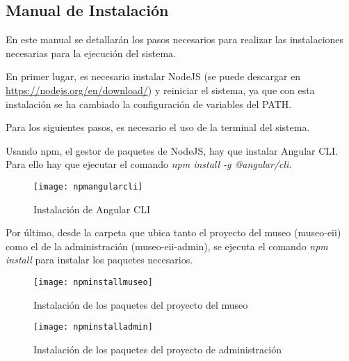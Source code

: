 \subsection{Manual de Instalación} 
En este manual se detallarán los pasos necesarios para realizar las instalaciones necesarias para la ejecución del sistema.\par
En primer lugar, es necesario instalar NodeJS (se puede descargar en \url{https://nodejs.org/en/download/}) y reiniciar el sistema, ya que con esta instalación se ha cambiado la configuración de variables del PATH.\par
Para los siguientes pasos, es necesario el uso de la terminal del sistema.\par
Usando npm, el gestor de paquetes de NodeJS, hay que instalar Angular CLI. Para ello hay que ejecutar el comando \textit{npm install -g @angular/cli}.
\begin{figure}[H]
\centering
\texttt{[image: npmangularcli]}
\caption{Instalación de Angular CLI}
\end{figure}
Por último, desde la carpeta que ubica tanto el proyecto del museo (museo-eii) como el de la administración (museo-eii-admin), se ejecuta el comando \textit{npm install} para instalar los paquetes necesarios.
\begin{figure}[H]
\centering
\texttt{[image: npminstallmuseo]}
\caption{Instalación de los paquetes del proyecto del museo}
\end{figure}
\begin{figure}[H]
\centering
\texttt{[image: npminstalladmin]}
\caption{Instalación de los paquetes del proyecto de administración}
\end{figure}


